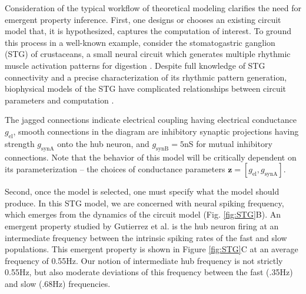 \documentclass[11pt]{article}
\begin{document}
Consideration of the typical workflow of theoretical modeling clarifies the need for emergent property inference.  
First, one designs or chooses an existing circuit model that, it is hypothesized, captures the computation of interest. 
To ground this process in a well-known example, consider the stomatogastric ganglion (STG) of crustaceans, a small neural circuit which generates multiple rhythmic muscle activation patterns for digestion \cite{marder2002cellular}.
Despite full knowledge of STG connectivity and a precise characterization of its rhythmic pattern generation, biophysical models of the STG have complicated relationships between circuit parameters and computation \cite{goldman2001global, prinz2004similar}.

The jagged connections indicate electrical coupling having electrical conductance $g_{\text{el}}$, smooth connections in the diagram are inhibitory synaptic projections having strength $g_{\text{synA}}$ onto the hub neuron, and $g_{\text{synB}}=5$nS for mutual inhibitory connections.
Note that the behavior of this model will be critically dependent on its parameterization -- the choices of conductance parameters $\mathbf{z} = [g_{\text{el}}, g_{\text{synA}}]$.

Second, once the model is selected, one must specify what the model should produce.
In this STG model, we are concerned with neural spiking frequency, which emerges from the dynamics of the circuit model (Fig. \ref{fig:STG}B).
An emergent property studied by Gutierrez et al. is the hub neuron firing at an intermediate frequency between the intrinsic spiking rates of the fast and slow populations.
This emergent property is shown in Figure \ref{fig:STG}C at an average frequency of 0.55Hz.
Our notion of intermediate hub frequency is not strictly 0.55Hz, but also moderate deviations of this frequency between the fast (.35Hz) and slow (.68Hz) frequencies.
\end{document}
